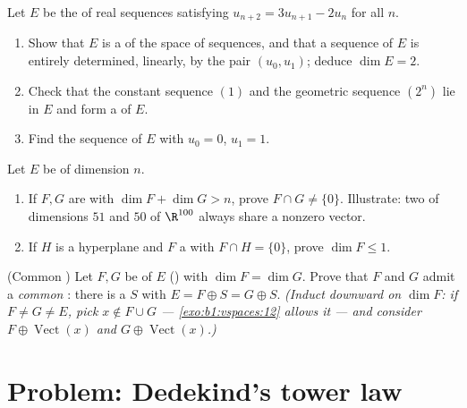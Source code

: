\begin{exercise}[$\star\star$]\label{exo:b1:findim:10}
Let $E$ be the  of real sequences satisfying $u_{n+2} =
3u_{n+1} - 2u_n$ for all $n$.
\begin{enumerate}
  \item Show that $E$ is a  of the space of sequences, and
        that a sequence of $E$ is entirely determined, linearly,
        by the pair $(u_0, u_1)$; deduce $\dim E = 2$.
  \item Check that the constant sequence $(1)$ and the geometric
        sequence $(2^n)$ lie in $E$ and form a  of $E$.
  \item Find the sequence of $E$ with $u_0 = 0$, $u_1 = 1$.
\end{enumerate}
\end{exercise}

\begin{exercise}[$\star\star$]\label{exo:b1:findim:11}
Let $E$ be of dimension $n$.
\begin{enumerate}
  \item If $F, G$ are  with $\dim F + \dim G > n$, prove
        $F \cap G \neq \{0\}$. Illustrate: two  of
        dimensions $51$ and $50$ of $\R^{100}$ always share a
        nonzero vector.
  \item If $H$ is a hyperplane and $F$ a  with $F \cap H =
        \{0\}$, prove $\dim F \leq 1$.
\end{enumerate}
\end{exercise}

\begin{exercise}[$\star\star\star$]\label{exo:b1:findim:12}
(Common ) Let $F, G$ be  of $E$ () with $\dim F = \dim G$. Prove that $F$ and $G$ admit a
\emph{common} : there is a  $S$ with $E = F
\oplus S = G \oplus S$. \emph{(Induct downward on $\dim F$: if $F
\neq G \neq E$, pick $x \notin F \cup G$ ---
\cref{exo:b1:vspaces:12} allows it --- and consider $F \oplus
\operatorname{Vect}(x)$ and $G \oplus \operatorname{Vect}(x)$.)}
\end{exercise}

\section{Problem: Dedekind's tower law}


